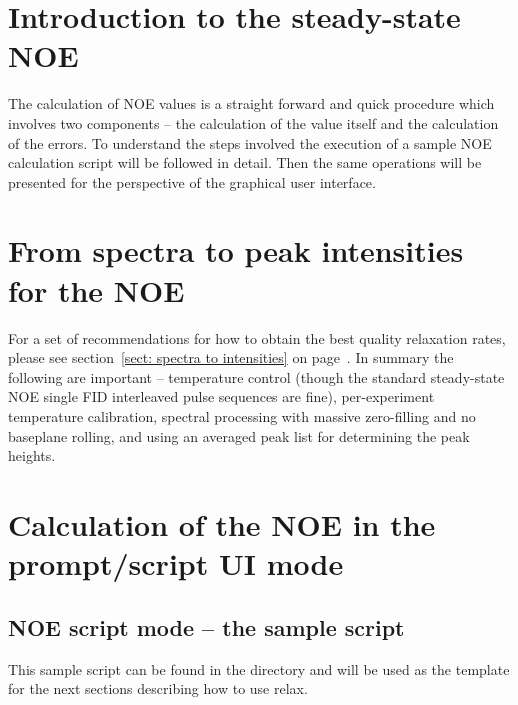 
\section{Introduction to the steady-state NOE}

The calculation of NOE values is a straight forward and quick procedure which involves two components -- the calculation of the value itself and the calculation of the errors.
To understand the steps involved the execution of a sample NOE calculation script will be followed in detail.
Then the same operations will be presented for the perspective of the graphical user interface.




\section{From spectra to peak intensities for the NOE}

For a set of recommendations for how to obtain the best quality relaxation rates, please see section~\ref{sect: spectra to intensities} on page~\pageref{sect: spectra to intensities}.
In summary the following are important -- temperature control (though the standard steady-state NOE single FID interleaved pulse sequences are fine), per-experiment temperature calibration, spectral processing with massive zero-filling and no baseplane rolling, and using an averaged peak list for determining the peak heights.




\section{Calculation of the NOE in the prompt/script UI mode}



\subsection{NOE script mode -- the sample script}

This sample script can be found in the  directory and will be used as the template for the next sections describing how to use relax.

